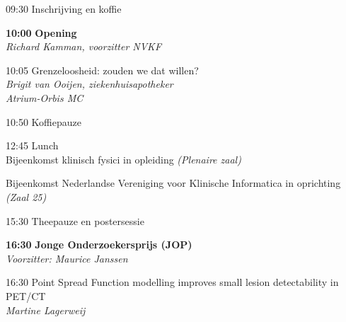 \documentclass[a4paper,10pt]{report}
\begin{document}
\begin{multicols*}{3}
    \setlength{\leftmargin}{-1cm}




\begin{packed_enum}
    \item[09:30] Inschrijving en koffie
        \vfill
    \item[\textbf{10:00}] \textbf{Opening}\\\textit{Richard Kamman, voorzitter NVKF}
        \vfill
    \item[10:05] Grenzeloosheid: zouden we dat willen?\\\textit{Brigit van Ooijen, ziekenhuisapotheker\\Atrium-Orbis MC}
        \vfill
    \item[10:50] Koffiepauze
        \vfill
    \item[{\color{Blue}{\textbf{11:20}}}] {}
        \vfill
    \item[12:45] Lunch\\
        {\small Bijeenkomst klinisch fysici in opleiding \hfill\textit{(Plenaire zaal)}}\\
        {\small Bijeenkomst Nederlandse Vereniging voor Klinische Informatica
        in oprichting \hfill\textit{(Zaal 25)}\strut}
        \vfill
    \item[{\color{Blue}{\textbf{14:00}}}] {}
        \vfill
    \item[15:30] Theepauze en postersessie 
        \vfill
    \item[\textbf{16:30}] {\textbf{Jonge Onderzoekersprijs (JOP)}}\\\textit{Voorzitter: Maurice Janssen}
    \item[16:30] Point Spread Function modelling improves small lesion detectability in PET/CT\\\textit{Martine Lagerweij}

\end{packed_enum}
\end{multicols*}
\end{document}
